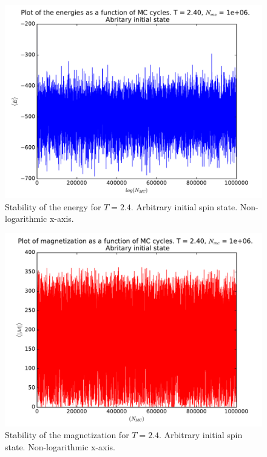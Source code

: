 \documentclass[12pt]{article}
\begin{document}
\begin{figure}[H]
\centering
\includegraphics[width=\linewidth]{Plots/Energy_stability_T24.pdf}
\caption{Stability of the energy for $T=2.4$. Arbitrary initial spin state. Non-logarithmic x-axis.}
\end{figure}

\begin{figure}[H]
\centering
\includegraphics[width=\linewidth]{Plots/Magnetization_stability_T24.pdf}
\caption{Stability of the magnetization for $T=2.4$. Arbitrary initial spin state. Non-logarithmic x-axis.}
\end{figure}
\end{document}
